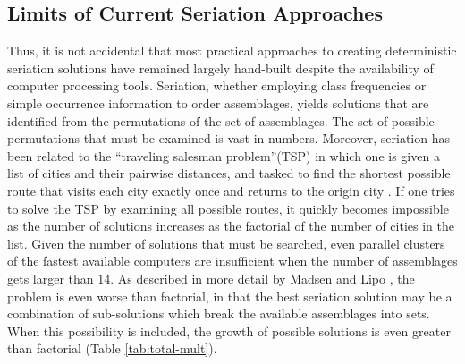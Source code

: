\documentclass[10pt,letterpaper]{article}
\begin{document}
\subsection*{Limits of Current Seriation Approaches}

Thus, it is not accidental that most practical approaches to creating deterministic seriation solutions have remained largely hand-built despite the availability of computer processing tools. Seriation, whether employing class frequencies or simple occurrence information to order assemblages, yields solutions that are identified from the permutations of the set of assemblages. The set of possible permutations that must be examined is vast in numbers. Moreover, seriation has been related to the ``traveling salesman problem''(TSP) in which one is given a list of cities and their pairwise distances, and tasked to find the shortest possible route that visits each city exactly once and returns to the origin city \cite{Kadane1971,Laporte1978,Wilkinson1971}. If one tries to solve the TSP by examining all possible routes, it quickly becomes impossible as the number of solutions increases as the factorial of the number of cities in the list. Given the number of solutions that must be searched, even parallel clusters of the fastest available computers are insufficient when the number of assemblages gets larger than 14. As described in more detail by Madsen and Lipo \cite{Madsen2014}, the problem is even worse than factorial, in that the best seriation solution may be a combination of sub-solutions which break the available assemblages into sets. When this possibility is included, the growth of possible solutions is even greater than factorial (Table \ref{tab:total-mult}).
\end{document}
